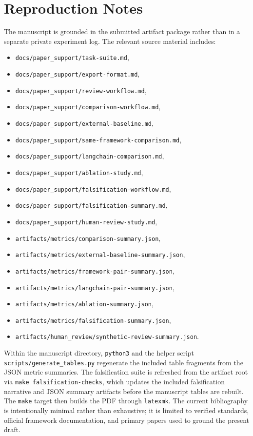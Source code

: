 \section{Reproduction Notes}

The manuscript is grounded in the submitted artifact package rather than in a separate private experiment log. The relevant source material includes:

\begin{itemize}
  \item \texttt{docs/paper\_support/task-suite.md},
  \item \texttt{docs/paper\_support/export-format.md},
  \item \texttt{docs/paper\_support/review-workflow.md},
  \item \texttt{docs/paper\_support/comparison-workflow.md},
  \item \texttt{docs/paper\_support/external-baseline.md},
  \item \texttt{docs/paper\_support/same-framework-comparison.md},
  \item \texttt{docs/paper\_support/langchain-comparison.md},
  \item \texttt{docs/paper\_support/ablation-study.md},
  \item \texttt{docs/paper\_support/falsification-workflow.md},
  \item \texttt{docs/paper\_support/falsification-summary.md},
  \item \texttt{docs/paper\_support/human-review-study.md},
  \item \texttt{artifacts/metrics/comparison-summary.json},
  \item \texttt{artifacts/metrics/external-baseline-summary.json},
  \item \texttt{artifacts/metrics/framework-pair-summary.json},
  \item \texttt{artifacts/metrics/langchain-pair-summary.json},
  \item \texttt{artifacts/metrics/ablation-summary.json},
  \item \texttt{artifacts/metrics/falsification-summary.json},
  \item \texttt{artifacts/human\_review/synthetic-review-summary.json}.
\end{itemize}

Within the manuscript directory, \texttt{python3} and the helper script \texttt{scripts/generate\_tables.py} regenerate the included table fragments from the JSON metric summaries. The falsification suite is refreshed from the artifact root via \texttt{make falsification-checks}, which updates the included falsification narrative and JSON summary artifacts before the manuscript tables are rebuilt. The \texttt{make} target then builds the PDF through \texttt{latexmk}. The current bibliography is intentionally minimal rather than exhaustive; it is limited to verified standards, official framework documentation, and primary papers used to ground the present draft.

